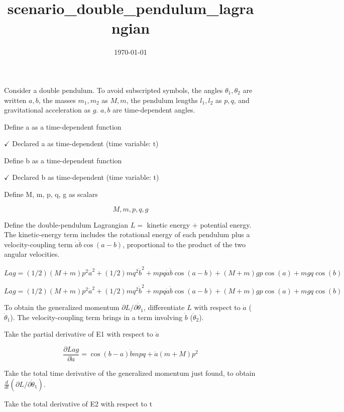\documentclass[dvipdfmx]{article}
\title{scenario\_double\_pendulum\_lagrangian}
\date{\today}
\begin{document}
\maketitle

Consider a double pendulum. To avoid subscripted symbols, the angles $\theta_1,\theta_2$ are written $a,b$, the masses $m_1,m_2$ as $M,m$, the pendulum lengths $l_1,l_2$ as $p,q$, and gravitational acceleration as $g$. $a,b$ are time-dependent angles.

Define a as a time-dependent function

$\checkmark$ Declared a as time-dependent (time variable: t)

Define b as a time-dependent function

$\checkmark$ Declared b as time-dependent (time variable: t)

Define M, m, p, q, g as scalars

\[
  M, m, p, q, g
\]

Define the double-pendulum Lagrangian $L=$ kinetic energy $+$ potential energy. The kinetic-energy term includes the rotational energy of each pendulum plus a velocity-coupling term $\dot a\dot b\cos(a-b)$, proportional to the product of the two angular velocities.

$Lag = (1/2) (M + m) p^2 \dot{a}^2 + (1/2) m q^2 \dot{b}^2 + m p q \dot{a} \dot{b} \cos(a - b) + (M + m) g p \cos(a) + m g q \cos(b)$

\begin{equation}
  Lag = (1/2) (M + m) p^2 \dot{a}^2 + (1/2) m q^2 \dot{b}^2 + m p q \dot{a} \dot{b} \cos(a - b) + (M + m) g p \cos(a) + m g q \cos(b)
  \label{eq:E1}
\end{equation}

To obtain the generalized momentum $\partial L/\partial\dot\theta_1$, differentiate $L$ with respect to $\dot a$ ($\dot\theta_1$). The velocity-coupling term brings in a term involving $\dot b$ ($\dot\theta_2$).

Take the partial derivative of E1 with respect to $\dot{a}$

\begin{equation}
  \frac{\partial Lag}{\partial \dot{a}} = \cos \left(b-a\right) \dot{b} m p q+\dot{a} \left(m+M\right) p^2
  \label{eq:E2}
\end{equation}

Take the total time derivative of the generalized momentum just found, to obtain $\frac{d}{dt}(\partial L/\partial\dot\theta_1)$.

Take the total derivative of E2 with respect to t
\end{document}
